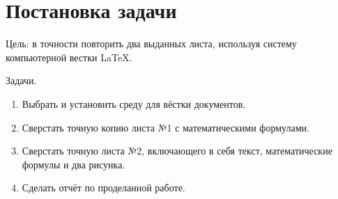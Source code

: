 \documentclass[a4paper, final]{article}
\begin{document}


{
\section{Постановка задачи}
\par Цель: в точности повторить два выданных листа, используя систему компьютерной вестки \LaTeX. \\
\par Задачи.
\begin{enumerate}
    \item Выбрать и установить среду для вёстки документов.
    \item Сверстать точную копию листа №1 с математическими формулами.
    \item Сверстать точную листа №2, включающего в себя текст, математические формулы и два рисунка.
    \item Сделать отчёт по проделанной работе.
\end{enumerate}
\newpage
}
\end{document}

